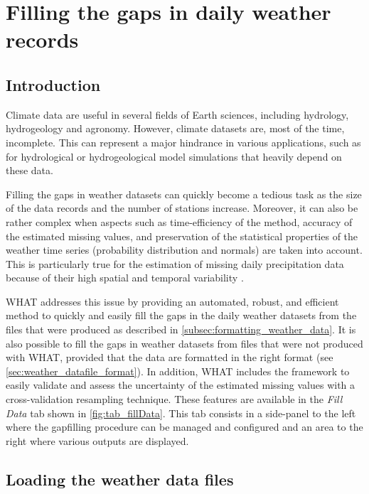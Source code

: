 \documentclass[WHATMANUAL.tex]{subfiles}
\begin{document}
\section{Filling the gaps in daily weather records}\label{guide-gapfilling}

\subsection{Introduction}

Climate data are useful in several fields of Earth sciences, including hydrology, hydrogeology and agronomy. However, climate datasets are, most of the time, incomplete. This can represent a major hindrance in various applications, such as for hydrological or hydrogeological model simulations that heavily depend on these data.

Filling the gaps in weather datasets can quickly become a tedious task as the size of the data records and the number of stations increase. Moreover, it can also be rather complex when aspects such as time-efficiency of the method, accuracy of the estimated missing values, and preservation of the statistical properties of the weather time series (probability distribution and normals) are taken into account. This is particularly true for the estimation of missing daily precipitation data because of their high spatial and temporal variability \citep{simolo_improving_2010}.

WHAT addresses this issue by providing an automated, robust, and efficient method to quickly and easily fill the gaps in the daily weather datasets from the files that were produced as described in \cref{subsec:formatting_weather_data}. It is also possible to fill the gaps in weather datasets from files that were not produced with WHAT, provided that the data are formatted in the right format (see \cref{sec:weather_datafile_format}). In addition, WHAT includes the framework to easily validate and assess the uncertainty of the estimated missing values with a cross-validation resampling technique. These features are available in the \emph{Fill Data} tab shown in \cref{fig:tab_fillData}. This tab consists in a side-panel to the left where the gapfilling procedure can be managed and configured and an area to the right where various outputs are displayed.

\subsection{Loading the weather data files}\label{subsec:creating_list}
\end{document}
